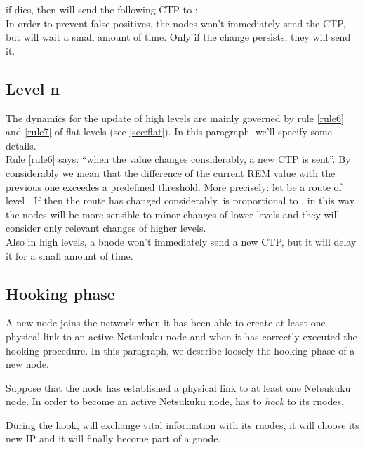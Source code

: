 \documentclass[a4paper]{article}
\begin{document}
if  dies, then  will send the following CTP to :
\\
\newline
In order to prevent false positives, the nodes won't immediately send the CTP, but
will wait a small amount of time. Only if the change persists, they will send it.

\subsection{Level n}
\label{sec:netdyn-leveln}
The dynamics for the update of high levels are mainly governed by rule
\ref{rule6} and \ref{rule7} of flat levels (see \ref{sec:flat}). In this
paragraph, we'll specify some details.\\
\newline
Rule \ref{rule6} says: ``when the value  changes
considerably, a new CTP is sent''.
By considerably we mean that the difference of the current REM value with the
previous one exceedes a predefined threshold. More precisely: let
 be a route of level . If 
then the route has changed considerably.  is proportional to , in this way the nodes will be
more sensible to minor changes of lower levels and they will consider only
relevant changes of higher levels.\\
\newline
Also in high levels, a bnode won't immediately send a new CTP, but it
will delay it for a small amount of time.

\subsection{Hooking phase}
A new node joins the network when it has been able to create at least one
physical link to an active Netsukuku node and when it has correctly executed
the hooking procedure. In this paragraph, we describe loosely the hooking
phase of a new node.

Suppose that the node  has established a physical link to at least one Netsukuku
node. In order to become an active Netsukuku node,  has to \emph{hook} to
its rnodes.

During the hook,  will exchange vital information with its rnodes,
it will choose its new IP and it will finally become part of a gnode.
\end{document}
